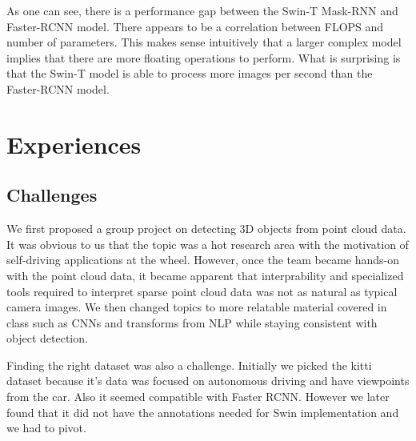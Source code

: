 \documentclass[10pt,twocolumn,letterpaper]{article}
\begin{document}
\begin{table}[hbt!]
\begin{center}
\end{center}
\caption{Model performance and complexity with 720p images}
\end{table}

As one can see, there is a performance gap between the Swin-T Mask-RNN and Faster-RCNN model. There appears to be a correlation between FLOPS and number of parameters. This makes sense intuitively that a larger complex model implies that there are more floating operations to perform. What is surprising is that the Swin-T model is able to process more images per second than the Faster-RCNN model.

\section{Experiences}

\subsection{Challenges}

We first proposed a group project on detecting 3D objects from point cloud data. It was obvious to us that the topic was a hot research area with the motivation of self-driving applications at the wheel. However, once the team became hands-on with the point cloud data, it became apparent that interprability and specialized tools required to interpret sparse point cloud data was not as natural as typical camera images. We then changed topics to more relatable material covered in class such as CNNs and transforms from NLP while staying consistent with object detection.

Finding the right dataset was also a challenge. Initially we picked the kitti dataset because it's data was focused on autonomous driving and have viewpoints from the car. Also it seemed compatible with Faster RCNN. However we later found that it did not have the annotations needed for Swin implementation and we had to pivot. 
\end{document}
